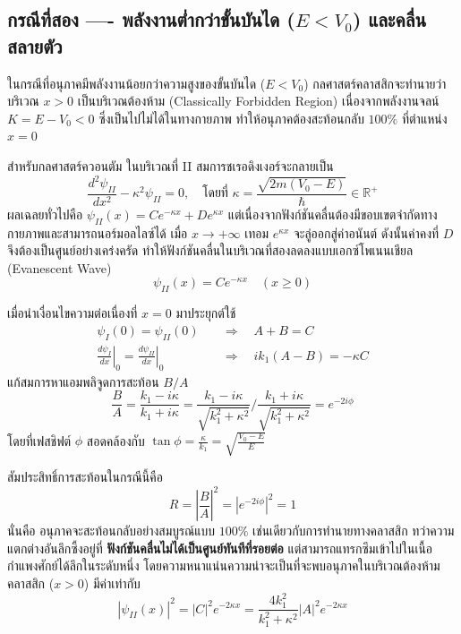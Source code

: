 \subsection{กรณีที่สอง ---- พลังงานต่ำกว่าขั้นบันได ($E < V_0$) และคลื่นสลายตัว}
ในกรณีที่อนุภาคมีพลังงานน้อยกว่าความสูงของขั้นบันได ($E < V_0$) กลศาสตร์คลาสสิกจะทำนายว่าบริเวณ $x > 0$ เป็นบริเวณต้องห้าม (Classically Forbidden Region) เนื่องจากพลังงานจลน์ $K = E - V_0 < 0$ ซึ่งเป็นไปไม่ได้ในทางกายภาพ ทำให้อนุภาคต้องสะท้อนกลับ $100\%$ ที่ตำแหน่ง $x = 0$

สำหรับกลศาสตร์ควอนตัม ในบริเวณที่ II สมการชเรอดิงเงอร์จะกลายเป็น
\begin{equation}
\frac{d^2\psi_{II}}{dx^2} - \kappa^2 \psi_{II} = 0, \quad \text{โดยที่ } \kappa = \frac{\sqrt{2m(V_0 - E)}}{\hbar} \in \mathbb{R}^+
\end{equation}
ผลเฉลยทั่วไปคือ $\psi_{II}(x) = C e^{-\kappa x} + D e^{\kappa x}$ แต่เนื่องจากฟังก์ชันคลื่นต้องมีขอบเขตจำกัดทางกายภาพและสามารถนอร์มอลไลซ์ได้ เมื่อ $x \to +\infty$ เทอม $e^{\kappa x}$ จะลู่ออกสู่ค่าอนันต์ ดังนั้นค่าคงที่ $D$ จึงต้องเป็นศูนย์อย่างเคร่งครัด ทำให้ฟังก์ชันคลื่นในบริเวณที่สองลดลงแบบเอกซ์โพเนนเชียล (Evanescent Wave)
\begin{equation}
\psi_{II}(x) = C e^{-\kappa x} \quad (x \ge 0)
\end{equation}

เมื่อนำเงื่อนไขความต่อเนื่องที่ $x = 0$ มาประยุกต์ใช้
\begin{align}
\psi_I(0) = \psi_{II}(0) \quad &\Longrightarrow \quad A + B = C \\
\left.\frac{d\psi_I}{dx}\right|_{0} = \left.\frac{d\psi_{II}}{dx}\right|_{0} \quad &\Longrightarrow \quad ik_1(A - B) = -\kappa C
\end{align}
แก้สมการหาแอมพลิจูดการสะท้อน $B/A$
\begin{equation}
\frac{B}{A} = \frac{k_1 - i\kappa}{k_1 + i\kappa} = \frac{k_1 - i\kappa}{\sqrt{k_1^2 + \kappa^2}} \Big/ \frac{k_1 + i\kappa}{\sqrt{k_1^2 + \kappa^2}} = e^{-2i\phi}
\end{equation}
โดยที่เฟสชิฟต์ $\phi$ สอดคล้องกับ $\tan\phi = \frac{\kappa}{k_1} = \sqrt{\frac{V_0 - E}{E}}$

สัมประสิทธิ์การสะท้อนในกรณีนี้คือ
\begin{equation}
R = \left| \frac{B}{A} \right|^2 = |e^{-2i\phi}|^2 = 1
\end{equation}
นั่นคือ อนุภาคจะสะท้อนกลับอย่างสมบูรณ์แบบ $100\%$ เช่นเดียวกับการทำนายทางคลาสสิก ทว่าความแตกต่างอันลึกซึ้งอยู่ที่ \textbf{ฟังก์ชันคลื่นไม่ได้เป็นศูนย์ทันทีที่รอยต่อ} แต่สามารถแทรกซึมเข้าไปในเนื้อกำแพงศักย์ได้ลึกในระดับหนึ่ง โดยความหนาแน่นความน่าจะเป็นที่จะพบอนุภาคในบริเวณต้องห้ามคลาสสิก ($x > 0$) มีค่าเท่ากับ
\begin{equation}
|\psi_{II}(x)|^2 = |C|^2 e^{-2\kappa x} = \frac{4k_1^2}{k_1^2 + \kappa^2} |A|^2 e^{-2\kappa x}
\end{equation}

